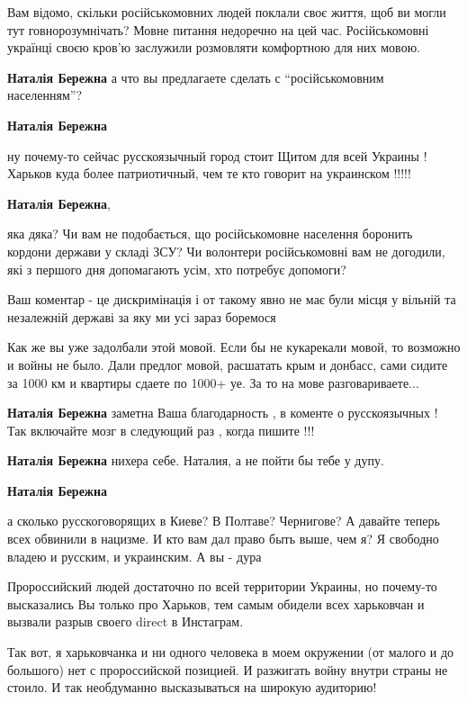 \begin{itemize}
\begin{itemize}

Вам відомо, скільки російськомовних людей поклали своє життя, щоб ви могли тут
говнорозумнічать? Мовне питання недоречно на цей час. Російськомовні українці
своєю кров'ю заслужили розмовляти комфортною для них мовою.

\textbf{Наталія Бережна} а что вы предлагаете сделать с \enquote{російськомовним населенням}?

\textbf{Наталія Бережна} 

ну почему-то сейчас русскоязычный город стоит Щитом для всей Украины ! Харьков
куда более патриотичный, чем те кто говорит на украинском !!!!!

\textbf{Наталія Бережна}, 

яка дяка? Чи вам не подобається, що російськомовне населення боронить кордони
держави у складі ЗСУ? Чи волонтери російськомовні вам не догодили, які з
першого дня допомагають усім, хто потребує допомоги?

Ваш коментар - це дискримінація і от такому явно не має були місця у вільній та
незалежній державі за яку ми усі зараз боремося


Как же вы уже задолбали этой мовой. Если бы не кукарекали мовой, то возможно и
войны не было. Дали предлог мовой, расшатать крым и донбасс, сами сидите за
1000 км и квартиры сдаете по 1000+ уе. За то на мове разговариваете...

\textbf{Наталія Бережна} заметна Ваша благодарность , в коменте о русскоязычных ! Так включайте мозг в следующий раз , когда пишите !!!

\textbf{Наталія Бережна} нихера себе. Наталия, а не пойти бы тебе у дупу.

\textbf{Наталія Бережна} 

а сколько русскоговорящих в Киеве? В Полтаве? Чернигове? А давайте теперь всех
обвинили в нацизме. И кто вам дал право быть выше, чем я? Я свободно владею и
русским, и украинским. А вы - дура


Пророссийский людей достаточно по всей территории Украины, но почему-то
высказались Вы только про Харьков, тем самым обидели всех харьковчан и вызвали
разрыв своего direct в Инстаграм.

Так вот, я харьковчанка и ни одного человека в моем окружении (от малого и до
большого) нет с пророссийской позицией. И разжигать войну внутри страны не
стоило. И так необдуманно высказываться на широкую аудиторию!


\end{itemize} %


\end{itemize} %
